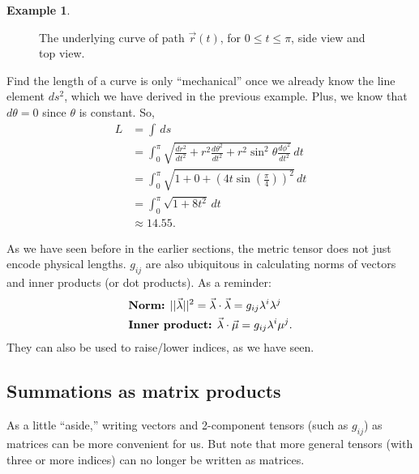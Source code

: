 \documentclass{book}
\theoremstyle{definition}
\newtheorem{exmp}{Example}[section]
\begin{document}
\begin{exmp}
\begin{figure}[h!]
	\caption{The underlying curve of path $\vec{r}(t)$, for $0 \leq t \leq \pi$, side view and top view.}
\end{figure}
Find the length of a curve is only ``mechanical'' once we already know the line element $ds^2$, which we have derived in the previous example. Plus, we know that $d\theta = 0$ since $\theta$ is constant. So,
\begin{align*}
L &= \int\,ds\\ 
&= \int_{0}^{\pi}\sqrt{\frac{dr^2}{dt^2} + r^2\frac{d\theta^2}{dt^2} + r^2\sin^2\theta\frac{d\phi^2}{dt^2}}\,dt\\
&= \int_{0}^{\pi}\sqrt{1 + 0 + \left( 4t\sin\left(\frac{\pi}{4} \right) \right) ^2}\,dt\\
&= \int_{0}^{\pi}\sqrt{1 + 8t^2}\,dt\\
&\approx 14.55. 
\end{align*}
\end{exmp}
As we have seen before in the earlier sections, the metric tensor does not just encode physical lengths. $g_{ij}$ are also ubiquitous in calculating norms of vectors and inner products (or dot products). As a reminder:
\begin{align*}
&\text{\textbf{Norm:} } \vert\vert \vec{\lambda} \vert\vert^2 = \vec{\lambda}\cdot\vec{\lambda} = g_{ij}\lambda^i\lambda^j\\
&\text{\textbf{Inner product:} } \vec{\lambda}\cdot\vec{\mu} = g_{ij}\lambda^i\mu^j.
\end{align*}
They can also be used to raise/lower indices, as we have seen. 
\subsection{Summations as matrix products}
As a little ``aside,'' writing vectors and 2-component tensors (such as $g_{ij}$) as matrices can be more convenient for us. But note that more general tensors (with three or more indices) can no longer be written as matrices.\\
\end{document}
